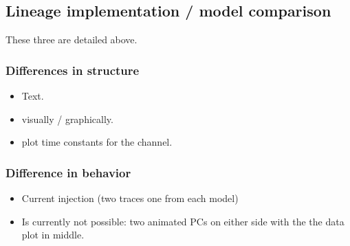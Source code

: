 \documentclass[12pt]{article}
\begin{document}
\subsection{Lineage implementation / model comparison}

These three are detailed above.

\subsubsection{Differences in structure}
\begin{itemize}
\item Text.
\item visually / graphically.
\item plot time constants for the channel.
\end{itemize}

\subsubsection{Difference in behavior}
\begin{itemize}
\item Current injection (two traces one from each model)
\item Is currently not possible: two animated PCs on either side with
  the the data plot in middle.
\end{itemize}
\end{document}
